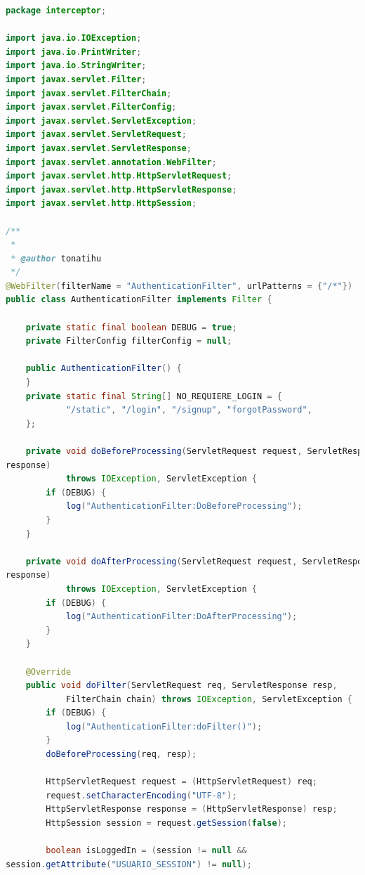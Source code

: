 \documentclass[a4paper,12pt]{article}
\begin{document}
\begin{lstlisting}[language=Java, style=customJava, 
caption={AuthenticationFilter.java},captionpos=b,basicstyle=\fontfamily{cmss}
\small]
package interceptor;

import java.io.IOException;
import java.io.PrintWriter;
import java.io.StringWriter;
import javax.servlet.Filter;
import javax.servlet.FilterChain;
import javax.servlet.FilterConfig;
import javax.servlet.ServletException;
import javax.servlet.ServletRequest;
import javax.servlet.ServletResponse;
import javax.servlet.annotation.WebFilter;
import javax.servlet.http.HttpServletRequest;
import javax.servlet.http.HttpServletResponse;
import javax.servlet.http.HttpSession;

/**
 *
 * @author tonatihu
 */
@WebFilter(filterName = "AuthenticationFilter", urlPatterns = {"/*"})
public class AuthenticationFilter implements Filter {
    
    private static final boolean DEBUG = true;
    private FilterConfig filterConfig = null;
    
    public AuthenticationFilter() {
    }
    private static final String[] NO_REQUIERE_LOGIN = {
            "/static", "/login", "/signup", "forgotPassword",
    };
    
    private void doBeforeProcessing(ServletRequest request, ServletResponse 
response)
            throws IOException, ServletException {
        if (DEBUG) {
            log("AuthenticationFilter:DoBeforeProcessing");
        }
    }    
    
    private void doAfterProcessing(ServletRequest request, ServletResponse 
response)
            throws IOException, ServletException {
        if (DEBUG) {
            log("AuthenticationFilter:DoAfterProcessing");
        }
    }
    
    @Override
    public void doFilter(ServletRequest req, ServletResponse resp, 
            FilterChain chain) throws IOException, ServletException {
        if (DEBUG) {
            log("AuthenticationFilter:doFilter()");
        }
        doBeforeProcessing(req, resp);
        
        HttpServletRequest request = (HttpServletRequest) req;
        request.setCharacterEncoding("UTF-8");
        HttpServletResponse response = (HttpServletResponse) resp;
        HttpSession session = request.getSession(false);

        boolean isLoggedIn = (session != null && 
session.getAttribute("USUARIO_SESSION") != null);


\end{lstlisting}
\end{document}
